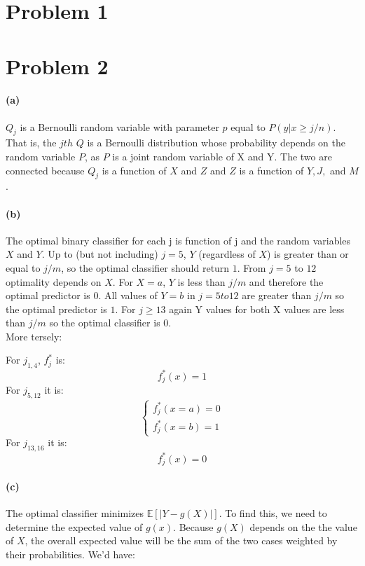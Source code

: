 \documentclass[twoside,11pt]{homework}
\begin{document}
\maketitle

\section*{Problem 1}

\section*{Problem 2}

\paragraph{(a)} $Q_j$ is a Bernoulli random variable with parameter $p$ equal to $P(y|x \geq j/n)$.  That is, the $jth$ $Q$ is a Bernoulli distribution whose probability depends on the random variable $P$, as $P$ is a joint random variable of X and Y.  The two are connected because $Q_j$ is a function of $X$ and $Z$ and $Z$ is a function of $Y, J,$ and $M$.

\paragraph{(b)} The optimal binary classifier for each j is function of j and the random variables $X$ and $Y$. Up to (but not including) $j=5$, $Y$ (regardless of $X$) is greater than or equal to $j/m$, so the optimal classifier should return $1$.  From $j=5$ to $12$ optimality depends on $X$.  For $X = a$, $Y$ is less than $j/m$ and therefore the optimal predictor is 0.  All values of $Y = b$ in $j=5 to 12$ are greater than $j/m$ so the optimal predictor is $1$. For $j \geq 13$ again Y values for both X values are less than $j/m$ so the optimal classifier is 0.\\

More tersely:

For $j_{1,4}$, $f_j^*$  is: 
$$f_j^*(x) = 1$$ For $j_{5,12}$ it is:
$$\begin{cases} 
	f_j^*(x=a) = 0 \\
	f_j^*(x=b) = 1
\end{cases} $$ For $j_{13,16}$ it is:
$$f_j^*(x) = 0$$ 

\paragraph{(c)}
The optimal classifier minimizes $\mathbb{E}[|Y - g(X)|]$.  To find this, we need to determine the expected value of $g(x)$.  Because $g(X)$ depends on the the value of $X$, the overall expected value will be the sum of the two cases weighted by their probabilities.  We'd have:
\end{document}
